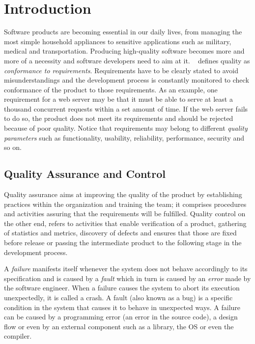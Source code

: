 \chapter{Introduction}
\label{chap:intro}

Software products are becoming essential in our daily lives, from managing the
most simple household appliances to sensitive applications such as military,
medical and transportation. Producing high-quality software becomes more and
more of a necessity and software developers need to aim at it.
\citeauthor{crosby1979art}~\cite{crosby1979art} defines quality as
\emph{conformance to requirements}. Requirements have to be clearly stated to
avoid misunderstandings and the development process is constantly monitored to
check conformance of the product to those requirements. As an example, one
requirement for a web server may be that it must be able to serve at least a
thousand concurrent requests within a set amount of time. If the web server
fails to do so, the product does not meet its requirements and should be
rejected because of poor quality. Notice that requirements may belong to
different \emph{quality parameters} such as functionality, usability,
reliability, performance, security and so on.

\section{Quality Assurance and Control}
Quality assurance aims at improving the quality of the product by establishing
practices within the organization and training the team; it comprises procedures
and activities assuring that the requirements will be fulfilled. Quality control
on the other end, refers to activities that enable verification of a product,
gathering of statistics and metrics, discovery of defects and ensures that those
are fixed before release or passing the intermediate product to the following
stage in the development process.

A \emph{failure} manifests itself whenever the system does not behave
accordingly to its specification and is caused by a \emph{fault} which in turn
is caused by an \emph{error} made by the software engineer. When a failure
causes the system to abort its execution unexpectedly, it is called a crash. A
fault (also known as a bug) is a specific condition in the system that causes it
to behave in unexpected ways. A failure can be caused by a programming error (an
error in the source code), a design flow or even by an external component such
as a library, the \ac{OS} or even the compiler.

